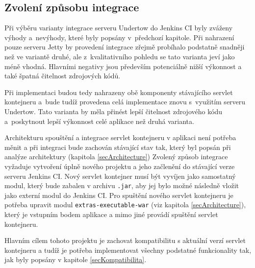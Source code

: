         \subsection{Zvolení způsobu integrace}
            Při výběru varianty integrace serveru Undertow do Jenkins CI byly zváženy
            výhody a~nevýhody, které byly popsány v~předchozí kapitole. Při nahrazení pouze serveru Jetty
            by provedení integrace zřejmě probíhalo podstatně snadněji než ve variantě druhé,
            ale z~kvalitativního pohledu se tato varianta jeví jako méně vhodná. 
            Hlavními 
            negativy jsou především potenciálně nižší výkonnost a také špatná čitelnost
            zdrojových kódů.

            Při implementaci budou tedy nahrazeny obě komponenty stávajícího servlet kontejneru
            a~bude tudíž provedena celá implementace znovu s~využitím serveru Undertow. Tato
            varianta by měla přinést lepší čitelnost zdrojového kódu a~poskytnout 
            lepší výkonnost celé aplikace než druhá varianta.


            \medskip
            Architekturu spouštění a integrace servlet kontejneru v aplikaci není potřeba měnit a při integraci bude
            zachován stávající stav tak, který byl popsán při analýze architektury (kapitola \ref{secArchitecture})
            Zvolený způsob integrace vyžaduje vytvoření úplně nového projektu a jeho začlenění do stávající
            verze serveru Jenkins CI. Nový servlet kontejner musí být vyvíjen jako samostatný modul,
            který bude zabalen v archivu \texttt{.jar}, aby jej bylo možné následně vložit jako externí modul do Jenkins CI.
            Pro spuštění nového servlet kontejneru
            je potřeba upravit modul \texttt{extras-executable-war} (viz kapitola \ref{secArchitecture}), který
            je vstupním bodem aplikace a mimo jiné provádí spuštění servlet kontejneru.
            
            Hlavním cílem tohoto projektu je zachovat kompatibilitu s aktuální verzí servlet kontejneru a tudíž je 
            potřeba implementovat všechny podstatné funkcionality tak, jak byly popsány v kapitole \ref{secKompatibilita}.
            












